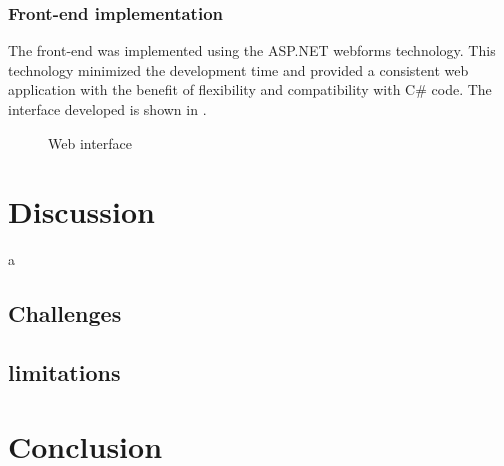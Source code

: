 \documentclass[a4paper,twoside]{IEEEtran}
\begin{document}
\subsubsection{Front-end implementation}
The front-end was implemented using the ASP.NET webforms technology. This technology minimized the development time and provided a consistent web application with the benefit of flexibility and compatibility with C\# code. The interface developed is shown in .
\begin{figure}
\centering
{}
\caption{Web interface}
\label{web}
\end{figure}
\section{Discussion}
a
\subsection{Challenges}
\subsection{limitations}


\section{Conclusion}









\end{document}

